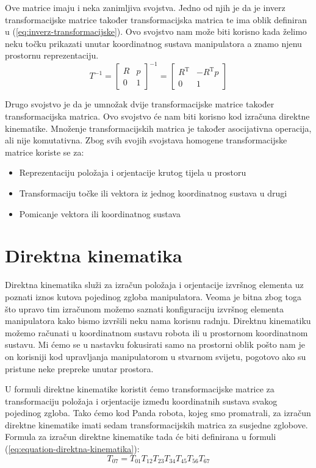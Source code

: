 \documentclass[times, utf8, diplomskirad]{fer}
\begin{document}
Ove matrice imaju i neka zanimljiva svojstva.
Jedno od njih je da je inverz transformacijske matrice također transformacijska matrica te ima oblik definiran u (\ref{eq:inverz-transformacijske}).
Ovo svojstvo nam može biti korisno kada želimo neku točku prikazati unutar koordinatnog sustava manipulatora a znamo njenu prostornu reprezentaciju.
\begin{equation}
    T^{-1}=\left[\begin{array}{cc}
    R & p \\
    0 & 1
    \end{array}\right]^{-1}=\left[\begin{array}{cc}
    R^{\mathrm{T}} & -R^{\mathrm{T}} p \\
    0 & 1
    \end{array}\right]
\label{eq:inverz-transformacijske}
\end{equation}

Drugo svojstvo je da je umnožak dvije transformacijske matrice također transformacijska matrica.
Ovo svojstvo će nam biti korisno kod izračuna direktne kinematike.
Množenje transformacijskih matrica je također asocijativna operacija, ali nije komutativna.
Zbog svih svojih svojstava homogene transformacijske matrice koriste se za:
\begin{itemize}
    \item Reprezentaciju položaja i orjentacije krutog tijela u prostoru
    \item Transformaciju točke ili vektora iz jednog koordinatnog sustava u drugi
    \item Pomicanje vektora ili koordinatnog sustava
\end{itemize}

\newpage
\section{Direktna kinematika}
Direktna kinematika služi za izračun položaja i orjentacije izvršnog elementa uz poznati iznos kutova pojedinog zgloba manipulatora.
Veoma je bitna zbog toga što upravo tim izračunom možemo saznati konfiguraciju izvršnog elementa manipulatora kako bismo izvršili neku nama korisnu radnju.
Direktnu kinematiku možemo računati u koordinatnom sustavu robota ili u prostornom koordinatnom sustavu.
Mi ćemo se u nastavku fokusirati samo na prostorni oblik pošto nam je on korisniji kod upravljanja manipulatorom u stvarnom svijetu, pogotovo ako su pristune neke prepreke unutar prostora.

U formuli direktne kinematike koristit ćemo transformacijske matrice za transformaciju položaja i orjentacije između koordinatnih sustava svakog pojedinog zgloba.
Tako ćemo kod Panda robota, kojeg smo promatrali, za izračun direktne kinematike imati sedam transformacijskih matrica za susjedne zglobove.
Formula za izračun direktne kinematike tada će biti definirana u formuli (\ref{eq:equation-direktna-kinematika}):
\begin{equation}
T_{07}=T_{01} T_{12} T_{23} T_{34} T_{45} T_{56} T_{67}
    \label{eq:equation-direktna-kinematika}
\end{equation}
\end{document}
